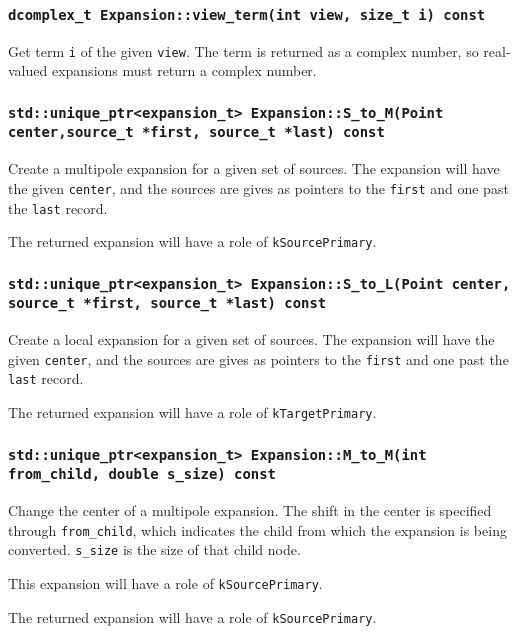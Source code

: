 \subsubsection{\texttt{dcomplex\_t Expansion::view\_term(int view, size\_t i) const}}

Get term \texttt{i} of the given \texttt{view}. The term is returned as a
complex number, so real-valued expansions must return a complex number.

\subsubsection{\texttt{std::unique\_ptr<expansion\_t> Expansion::S\_to\_M(Point center,source\_t *first, source\_t *last) const}}

Create a multipole expansion for a given set of sources. The expansion will
have the given \texttt{center}, and the sources are gives as pointers to the
\texttt{first} and one past the \texttt{last} record.

The returned expansion will have a role of \texttt{kSourcePrimary}.

\subsubsection{\texttt{std::unique\_ptr<expansion\_t> Expansion::S\_to\_L(Point center, source\_t *first, source\_t *last) const}}

Create a local expansion for a given set of sources. The expansion will
have the given \texttt{center}, and the sources are gives as pointers to the
\texttt{first} and one past the \texttt{last} record.

The returned expansion will have a role of \texttt{kTargetPrimary}.

\subsubsection{\texttt{std::unique\_ptr<expansion\_t> Expansion::M\_to\_M(int from\_child, double s\_size) const}}

Change the center of a multipole expansion. The shift in the center is
specified through \texttt{from\_child}, which indicates the child from which
the expansion is being converted. \texttt{s\_size} is the size of that child
node.

This expansion will have a role of \texttt{kSourcePrimary}.

The returned expansion will have a role of \texttt{kSourcePrimary}.


